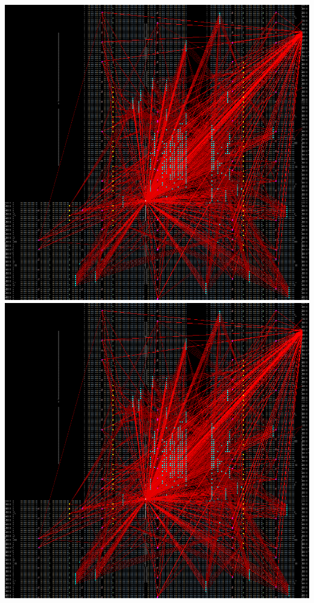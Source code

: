 {    \includegraphics[valign=t, scale=0.13]{figures/results/PlacerAnnealMidpoint/00000100.png}
    \includegraphics[valign=t, scale=0.13]{figures/results/PlacerAnnealMidpoint/00000299.png}
    \label{fig:PAMSnapshots}
}
